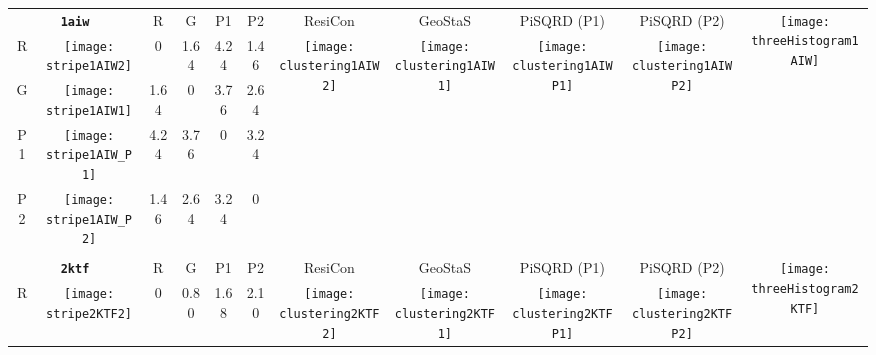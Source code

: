 \documentclass[a4paper,11pt,twoside]{book}%
\begin{document}
\begin{appendices}
\begin{sidewaystable}[h!]
\sffamily
\begin{tabular*}{4cm}{cc|c|c|c|c|c|c|c|c|c|}
\cline{1-11}
\multicolumn{2}{|c|}{{\bf \texttt{1aiw}}} & R & G & P1 & P2 & ResiCon & GeoStaS & PiSQRD (P1) & PiSQRD (P2) & \multirow{5}{*}{\vspace{-0.15cm}\texttt{[image: threeHistogram1AIW]}}  \\
\cline{1-10}
\multicolumn{1}{|c|}{R} & \texttt{[image: stripe1AIW2]} & 0 & 1.64 & 4.24 & 1.46 & \multirow{4}{*}{\vspace{-0.3cm}\texttt{[image: clustering1AIW2]}} & \multirow{4}{*}{\vspace{-0.3cm}\texttt{[image: clustering1AIW1]}} & \multirow{4}{*}{\vspace{-0.3cm}\texttt{[image: clustering1AIWP1]}} & \multirow{4}{*}{\vspace{-0.3cm}\texttt{[image: clustering1AIWP2]}} &  \multirow{5}{*}{} \\
\cline{1-6}
\multicolumn{1}{|c|}{G} & \texttt{[image: stripe1AIW1]} & 1.64 & 0 & 3.76 & 2.64 & \multirow{4}{*}{} & \multirow{4}{*}{} & \multirow{4}{*}{} & \multirow{4}{*}{} & \multirow{5}{*}{} \\
\cline{1-6}
\multicolumn{1}{|c|}{P1} & \texttt{[image: stripe1AIW\_P1]} & 4.24 & 3.76 & 0 & 3.24 & \multirow{4}{*}{} & \multirow{4}{*}{} & \multirow{4}{*}{} & \multirow{4}{*}{} & \multirow{5}{*}{}  \\
\cline{1-6}
\multicolumn{1}{|c|}{P2} & \texttt{[image: stripe1AIW\_P2]} & 1.46 & 2.64 & 3.24 & 0 & \multirow{4}{*}{} & \multirow{4}{*}{} & \multirow{4}{*}{} & \multirow{4}{*}{} & \multirow{5}{*}{}  \\
\cline{1-11}
\\
\cline{1-11}
\multicolumn{2}{|c|}{{\bf \texttt{2ktf}}} & R & G & P1 & P2 & ResiCon & GeoStaS & PiSQRD (P1) & PiSQRD (P2) & \multirow{5}{*}{\vspace{-0.15cm}\texttt{[image: threeHistogram2KTF]}}  \\
\cline{1-10}
\multicolumn{1}{|c|}{R} & \texttt{[image: stripe2KTF2]} & 0 & 0.80 & 1.68 & 2.10 & \multirow{4}{*}{\vspace{-0.3cm}\texttt{[image: clustering2KTF2]}} & \multirow{4}{*}{\vspace{-0.3cm}\texttt{[image: clustering2KTF1]}} & \multirow{4}{*}{\vspace{-0.3cm}\texttt{[image: clustering2KTFP1]}} & \multirow{4}{*}{\vspace{-0.3cm}\texttt{[image: clustering2KTFP2]}} &  \multirow{5}{*}{} \\

\end{tabular*}
\end{sidewaystable}
\end{appendices}
\end{document}
